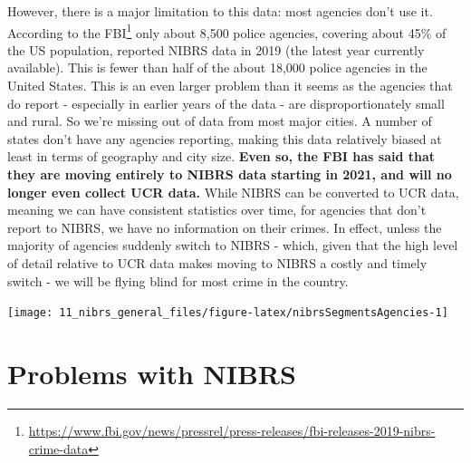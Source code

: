 \documentclass[
]{krantz}
\let\origfigure\figure
\let\endorigfigure\endfigure
\renewenvironment{figure}[1][2] {
    \expandafter\origfigure\expandafter[H]
} {
    \endorigfigure
}
\renewcommand{\href}[2]{#2\footnote{\url{#1}}}
\begin{document}
However, there is a major limitation to this data: most
agencies don't use it.
\href{https://www.fbi.gov/news/pressrel/press-releases/fbi-releases-2019-nibrs-crime-data}{According
to the FBI} only about 8,500 police agencies, covering about
45\% of the US population, reported NIBRS data in 2019 (the
latest year currently available). This is fewer than half of
the about 18,000 police agencies in the United States. This
is an even larger problem than it seems as the agencies that
do report - especially in earlier years of the data - are
disproportionately small and rural. So we're missing out of
data from most major cities. A number of states don't have
any agencies reporting, making this data relatively biased
at least in terms of geography and city size. \textbf{Even
so, the FBI has said that they are moving entirely to NIBRS
data starting in 2021, and will no longer even collect UCR
data.} While NIBRS can be converted to UCR data, meaning we
can have consistent statistics over time, for agencies that
don't report to NIBRS, we have no information on their
crimes. In effect, unless the majority of agencies suddenly
switch to NIBRS - which, given that the high level of detail
relative to UCR data makes moving to NIBRS a costly and
timely switch - we will be flying blind for most crime in
the country.

\begin{figure}

{\centering \texttt{[image: 11\_nibrs\_general\_files/figure-latex/nibrsSegmentsAgencies-1]} 

}

\caption{The number of agencies reporting data for each of the NIBRS Segments, 1991-2022.}\label{fig:nibrsSegmentsAgencies}
\end{figure}

\section{Problems with NIBRS}\label{problems-with-nibrs}
\end{document}
